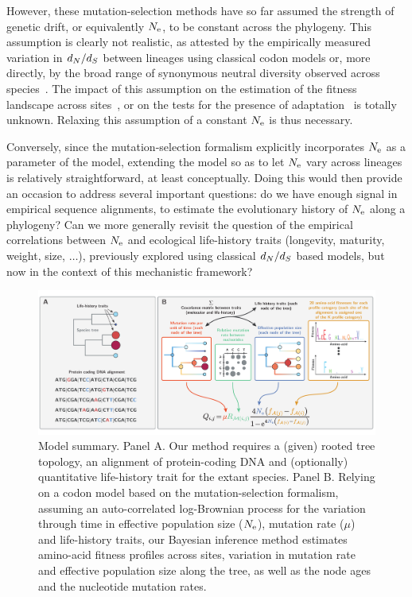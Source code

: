 \documentclass{MBE}
\begin{document}
	However, these mutation-selection methods have so far assumed the strength of {genetic drift}, or equivalently $N_{\text{e}}$, to be constant across the phylogeny.
	This assumption is clearly not realistic, as attested by the empirically measured variation in $d_N / d_S$ between lineages using classical {codon} models or, more directly, by the broad range of {synonymous} {neutral} diversity observed across species~\citep{Galtier2016}.
	The impact of this assumption on the estimation of the fitness landscape across sites~\citep{Tamuri2014, Rodrigue2014}, or on the tests for the presence of adaptation~\citep{Rodrigue2016} is totally unknown.
	Relaxing this assumption of a constant $N_{\text{e}}$ is thus necessary.

	Conversely, since the mutation-selection formalism explicitly incorporates $N_{\text{e}}$ as a parameter of the model, extending the model so as to let $N_{\text{e}}$ vary across lineages is relatively straightforward, at least conceptually.
	Doing this would then provide an occasion to address several important questions: do we have enough signal in empirical sequence alignments, to estimate the evolutionary history of $N_{\text{e}}$ along a phylogeny?
	Can we more generally revisit the question of the empirical correlations between $N_{\text{e}}$ and ecological life-history traits (longevity, maturity, weight, size, $\hdots$), previously explored using classical $d_N / d_S$ based models, but now in the context of this mechanistic framework?

	\begin{figure}[t]
		\begin{center}
		\includegraphics[width=\textwidth] {model_summary.pdf}
		\end{center}
		\caption[Model summary]{
		Model summary.
		Panel A.
		Our method requires a (given) rooted tree topology, an alignment of protein-coding DNA and (optionally) quantitative life-history trait for the extant species.
		Panel B.
		Relying on a codon model based on the mutation-selection formalism, assuming an auto-correlated log-Brownian process for the variation through time in effective population size ($N_{\text{e}}$), mutation rate ($\mu$) and life-history traits, our Bayesian inference method estimates amino-acid fitness profiles across sites, variation in mutation rate and effective population size along the tree, as well as the node ages and the nucleotide mutation rates.}
		\label{fig:modelSummary}
	\end{figure}
\end{document}
